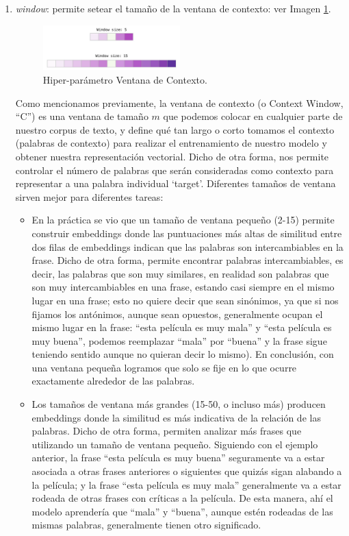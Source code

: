 \documentclass[12pt,a4paper]{article}
\begin{document}
\begin{sloppypar}
\begin{enumerate}
\item \textit{window}: permite setear el tamaño de la ventana de contexto: ver Imagen \ref{fig:5_Window}.

\begin{figure}[H] 
 \centering
 \includegraphics[width=0.5\textwidth]{images/implementacion_5/5_Window.png}
\captionsetup{justification=centering,margin=2cm}
 \caption{Hiper-parámetro Ventana de Contexto\cite{datitos_nlp}.}
 \label{fig:5_Window}
\end{figure}

Como mencionamos previamente, la ventana de contexto (o Context Window, “C”) es una ventana de tamaño $m$ que podemos colocar en cualquier parte de nuestro corpus de texto, y define qué tan largo o corto tomamos el contexto (palabras de contexto) para realizar el entrenamiento de nuestro modelo y obtener nuestra representación vectorial\cite{NLP_26}. Dicho de otra forma, nos permite controlar el número de palabras que serán consideradas como contexto para representar a una palabra individual ‘target’. Diferentes tamaños de ventana sirven mejor para diferentes tareas\cite{datitos_nlp}:
\begin{itemize}
\item En la práctica se vio que un tamaño de ventana pequeño (2-15) permite construir embeddings donde las puntuaciones más altas de similitud entre dos filas de embeddings indican que las palabras son intercambiables en la frase. Dicho de otra forma, permite encontrar palabras intercambiables, es decir, las palabras que son muy similares, en realidad son palabras que son muy intercambiables en una frase, estando casi siempre en el mismo lugar en una frase; esto no quiere decir que sean sinónimos, ya que si nos fijamos los antónimos, aunque sean opuestos, generalmente ocupan el mismo lugar en la frase: “esta película es muy mala” y “esta película es muy buena”, podemos reemplazar “mala” por “buena” y la frase sigue teniendo sentido aunque no quieran decir lo mismo). En conclusión, con una ventana pequeña logramos que solo se fije en lo que ocurre exactamente alrededor de las palabras. 
\item Los tamaños de ventana más grandes (15-50, o incluso más) producen embeddings donde la similitud es más indicativa de la relación de las palabras. Dicho de otra forma, permiten analizar más frases que utilizando un tamaño de ventana pequeño. Siguiendo con el ejemplo anterior, la frase “esta película es muy buena” seguramente va a estar asociada a otras frases anteriores o siguientes que quizás sigan alabando a la película; y la frase “esta película es muy mala” generalmente va a estar rodeada de otras frases con críticas a la película. De esta manera, ahí el modelo aprendería que “mala” y “buena”, aunque estén rodeadas de las mismas palabras, generalmente tienen otro significado. 
\end{itemize}


\end{enumerate}
\end{sloppypar}
\end{document}
